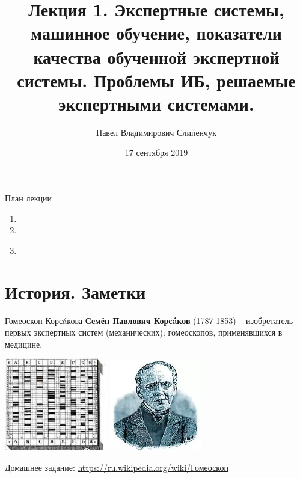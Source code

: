 \documentclass{beamer}
\title{Лекция 1. Экспертные системы, машинное обучение, показатели качества обученной экспертной системы. Проблемы ИБ, решаемые экспертными системами.}
\date{17 сентября 2019}
\author{Павел Владимирович Слипенчук}
\institute{Москва, МГТУ им.Бауманка,\\ каф.ИУ-8, КИБ}
\begin{document}
  \maketitle
    
  \begin{frame}{План лекции}
    \begin{enumerate}
    \item {}
    \item {}
    \item \
	\end{enumerate}
 \end{frame}
 
 \section{История. Заметки}\label{section:history_remarks}
  
  \begin{frame}{Гомеоскоп Корсáкова}
    \textbf{Семён Павлович Корсáков}
    (1787-1853) 
    -- изобретатель первых экспертных систем 
    (механических): гомеоскопов, применявшихся в медицине.  
    \begin{center}
    		\includegraphics[width=4.5cm]{../pic/gomeoskop.png}\centering
    		\includegraphics[width=4cm]{../pic/korsakov.png}\centering
    \end{center}
    Домашнее задание: \url{https://ru.wikipedia.org/wiki/Гомеоскоп}
  \end{frame}
  
\end{document}
